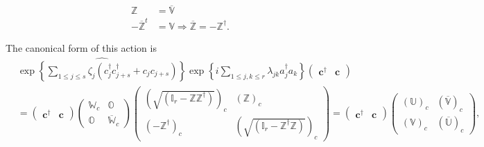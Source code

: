 \documentclass[aps, preprint]{revtex4}
\begin{document}
\begin{align}\mathbb{Z} &  =\overline{\mathbb{V}} \\
 -\overline{\mathbb{Z}}^{t} &  =\mathbb{V} \Rightarrow \overline{\mathbb{Z}} = -\mathbb{Z}^{ \dag }\text{.}\end{align}

The canonical form of this action is
\begin{align} & \widehat{\exp  \left \{ \sum _{1 \leq j \leq s}\zeta _{j} \left (c_{j}^{ \dag } c_{j +s}^{ \dag } +c_{j} c_{j +s}\right )\right \}} \exp  \left \{i \sum _{1 \leq j ,k \leq r}\lambda _{j k} a_{j}^{ \dag } a_{k}\right \} \left (\begin{array}{cc}\mathbf{c}^{ \dag } & \mathbf{c}\end{array}\right ) \\
 &  =\left (\begin{array}{cc}\mathbf{c}^{ \dag } & \mathbf{c}\end{array}\right ) \left (\begin{array}{cc}\mathbb{W}_{c} & \mathbb{O} \\
\mathbb{O} & \overline{\mathbb{W}}_{c}\end{array}\right ) \left (\begin{array}{cc}\left (\sqrt{\left (\mathbb{I}_{r} -\mathbb{Z} \mathbb{Z}^{ \dag }\right )}\right )_{c} & \left (\mathbb{Z}\right )_{c} \\
\left ( -\mathbb{Z}^{ \dag }\right )_{c} & \left (\sqrt{\left (\mathbb{I}_{r} -\mathbb{Z}^{ \dag } \mathbb{Z}\right )}\right )_{c}\end{array}\right ) =\left (\begin{array}{cc}\mathbf{c}^{ \dag } & \mathbf{c}\end{array}\right ) \left (\begin{array}{cc}\left (\mathbb{U}\right )_{c} & \left (\overline{\mathbb{V}}\right )_{c} \\
\left (\mathbb{V}\right )_{c} & \left (\overline{\mathbb{U}}\right )_{c}\end{array}\right )\text{,}\end{align}
\end{document}
